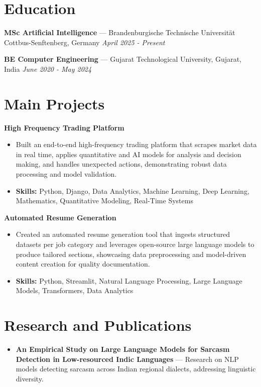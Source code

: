 \documentclass[a4paper,10pt]{article}
\begin{document}
\section*{Education}
\textbf{MSc Artificial Intelligence} — Brandenburgische Technische Universität Cottbus-Senftenberg, Germany \hfill \textit{April 2025 - Present}\par
\vspace{1.5pt}
\textbf{BE Computer Engineering} — Gujarat Technological University, Gujarat, India \hfill \textit{June 2020 - May 2024}\par

\section*{Main Projects}
\textbf{High Frequency Trading Platform}\par
\vspace{1pt}
\begin{itemize}
  \item Built an end-to-end high-frequency trading platform that scrapes market data in real time, applies quantitative and AI models for analysis and decision making, and handles unexpected actions, demonstrating robust data processing and model validation.
  \item \textbf{Skills:} Python, Django, Data Analytics, Machine Learning, Deep Learning, Mathematics, Quantitative Modeling, Real-Time Systems
\end{itemize}
\vspace{3pt}
\textbf{Automated Resume Generation}\par
\vspace{1pt}
\begin{itemize}
  \item Created an automated resume generation tool that ingests structured datasets per job category and leverages open-source large language models to produce tailored sections, showcasing data preprocessing and model-driven content creation for quality documentation.
  \item \textbf{Skills:} Python, Streamlit, Natural Language Processing, Large Language Models, Transformers, Data Analytics
\end{itemize}

\section*{Research and Publications}
\begin{itemize}
\item \textbf{An Empirical Study on Large Language Models for Sarcasm Detection in Low-resourced Indic Languages} — Research on NLP models detecting sarcasm across Indian regional dialects, addressing linguistic diversity.
\end{itemize}
\end{document}
